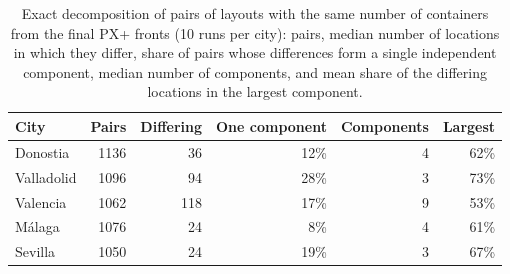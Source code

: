 \begin{table}[htbp]
\centering
\small
\caption{Exact decomposition of pairs of layouts with the same number of containers from the final PX+ fronts (10 runs per city): pairs, median number of locations in which they differ, share of pairs whose differences form a single independent component, median number of components, and mean share of the differing locations in the largest component.}
\label{tab:components}
\begin{tabular}{lrrrrr}
\toprule
\textbf{City} & \textbf{Pairs} & \textbf{Differing} & \textbf{One component} & \textbf{Components} & \textbf{Largest} \\
\midrule
Donostia & 1136 & 36 & 12\% & 4 & 62\% \\
Valladolid & 1096 & 94 & 28\% & 3 & 73\% \\
Valencia & 1062 & 118 & 17\% & 9 & 53\% \\
Málaga & 1076 & 24 & 8\% & 4 & 61\% \\
Sevilla & 1050 & 24 & 19\% & 3 & 67\% \\
\bottomrule
\end{tabular}
\end{table}
